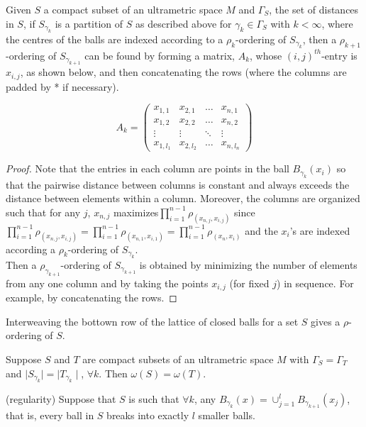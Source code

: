 \begin{proposition*}
Given $S$ a compact subset of an ultrametric space $M$ and $\Gamma_S$, the set of distances in $S$, if $S_{\gamma_k}$ is a partition of $S$ as described above for $\gamma_k \in \Gamma_S$ with $k < \infty$, where the centres of the balls are indexed according to a $\rho_k$-ordering of $S_{\gamma_k}$, then a $\rho_{k+1}$-ordering of $S_{\gamma_{k+1}}$ can be found by forming a matrix, $A_k$, whose $(i,j)^{th}$-entry is $x_{i,j}$, as shown below, and then concatenating the rows (where the columns are padded by * if necessary). 
\end{proposition*}

\[A_k=
 \begin{pmatrix}
  x_{1,1} & x_{2,1} & \ldots  &x_{n,1} \\
  x_{1,2} & x_{2,2} &\ldots &x_{n,2} \\
  \vdots & \vdots & \ddots & \vdots \\
  x_{1,l_1} & x_{2,l_2} & \ldots &x_{n,l_n}
 \end{pmatrix}
\]


\begin{proof}
Note that the entries in each column are points in the ball $B_{\gamma_k}(x_i)$ so that the pairwise distance between columns is constant and always exceeds the distance between elements within a column. Moreover, the columns are organized such that for any $j$, $x_{n,j}$ maximizes$\prod_{i=1}^{n-1} \rho_(x_{n,j},x_{i,j})$ since $\prod_{i=1}^{n-1} \rho_(x_{n,j},x_{i,j}) = \prod_{i=1}^{n-1} \rho_(x_{n,1},x_{i,1}) = \prod_{i=1}^{n-1} \rho_(x_{n},x_{i})$ and the $x_i$'s are indexed according a $\rho_k$-ordering of $S_{\gamma_k}$.\\

Then a $\rho_{\gamma_{k+1}}$-ordering of $S_{\gamma_{k+1}}$ is obtained by minimizing the number of elements from any one column and by taking the points $x_{i,j}$ (for fixed $j$) in sequence. For example, by concatenating the rows.
\end{proof}

\begin{corollary*}
Interweaving the bottown row of the lattice of closed balls for a set $S$ gives a $\rho$-ordering of $S$. 
\end{corollary*}

\begin{corollary*}
Suppose $S$ and $T$ are compact subsets of an ultrametric space $M$ with $\Gamma_S = \Gamma_T$ and $\mid S_{\gamma_k}\mid =\mid T_{\gamma_k}\mid$, $\forall k$. Then $\omega(S) = \omega(T)$. 
\end{corollary*}

\begin{corollary*}
(regularity) Suppose that $S$ is such that $\forall k$, any $B_{\gamma_k}(x)=\cup_{j=1}^l B_{\gamma_{k+1}}(x_j)$, that is, every ball in $S$ breaks into exactly $l$ smaller balls. 
\end{corollary*}

                    